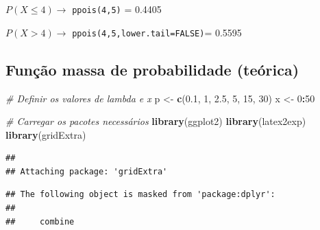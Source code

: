 \documentclass[
]{book}
\newenvironment{Shaded}{\begin{snugshade}}{\end{snugshade}}
\newcommand{\CommentTok}[1]{\textcolor[rgb]{0.56,0.35,0.01}{\textit{#1}}}
\newcommand{\DecValTok}[1]{\textcolor[rgb]{0.00,0.00,0.81}{#1}}
\newcommand{\FloatTok}[1]{\textcolor[rgb]{0.00,0.00,0.81}{#1}}
\newcommand{\FunctionTok}[1]{\textcolor[rgb]{0.13,0.29,0.53}{\textbf{#1}}}
\newcommand{\NormalTok}[1]{#1}
\newcommand{\OtherTok}[1]{\textcolor[rgb]{0.56,0.35,0.01}{#1}}
\newcommand{\SpecialCharTok}[1]{\textcolor[rgb]{0.81,0.36,0.00}{\textbf{#1}}}
\begin{document}
\noindent \(P(X\leq 4) \to\) \texttt{ppois(4,5)} = 0.4405

\noindent \(P(X > 4)\to\) \texttt{ppois(4,5,lower.tail=FALSE)}= 0.5595

\subsection{Função massa de probabilidade (teórica)}\label{funuxe7uxe3o-massa-de-probabilidade-teuxf3rica-1}

\begin{Shaded}
\begin{Highlighting}[]
\CommentTok{\# Definir os valores de lambda e x}
\NormalTok{p }\OtherTok{\textless{}{-}} \FunctionTok{c}\NormalTok{(}\FloatTok{0.1}\NormalTok{, }\DecValTok{1}\NormalTok{, }\FloatTok{2.5}\NormalTok{, }\DecValTok{5}\NormalTok{, }\DecValTok{15}\NormalTok{, }\DecValTok{30}\NormalTok{)}
\NormalTok{x }\OtherTok{\textless{}{-}} \DecValTok{0}\SpecialCharTok{:}\DecValTok{50}

\CommentTok{\# Carregar os pacotes necessários}
\FunctionTok{library}\NormalTok{(ggplot2)}
\FunctionTok{library}\NormalTok{(latex2exp)}
\FunctionTok{library}\NormalTok{(gridExtra)}
\end{Highlighting}
\end{Shaded}

\begin{verbatim}
## 
## Attaching package: 'gridExtra'
\end{verbatim}

\begin{verbatim}
## The following object is masked from 'package:dplyr':
## 
##     combine
\end{verbatim}
\end{document}
